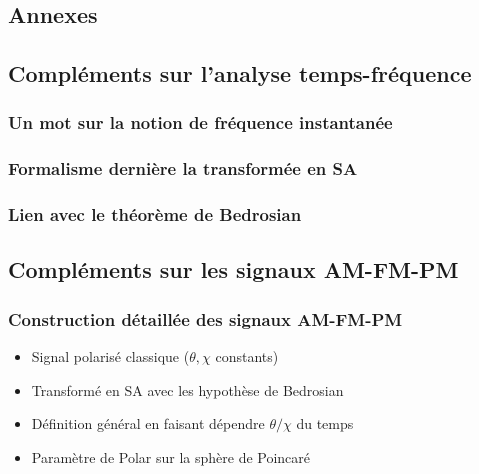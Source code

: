 \begin{annexe}

\section{Annexes}

\subsection{Compléments sur l'analyse temps-fréquence}\label{ann:complement_t-f}

\subsubsection{Un mot sur la notion de fréquence instantanée }\label{ann:freq_instant}

\subsubsection{Formalisme dernière la transformée en SA}\label{ann:transfo_SA}

\subsubsection{Lien avec le théorème de Bedrosian}\label{ann:bedrosian}

\subsection{Compléments sur les signaux AM-FM-PM}\label{ann:AM-FM-PM}

\subsubsection{Construction détaillée des signaux AM-FM-PM }\label{ann:construc_AM-FM-PM}

\begin{itemize}
	
	\item Signal polarisé classique ($\theta,\chi$ constants)
	
	\item Transformé en SA avec les hypothèse de Bedrosian 
	
	\item Définition général en faisant dépendre $\theta / \chi$ du temps
	
	\item Paramètre de Polar sur la sphère de Poincaré
	

\end{itemize}
\end{annexe}

